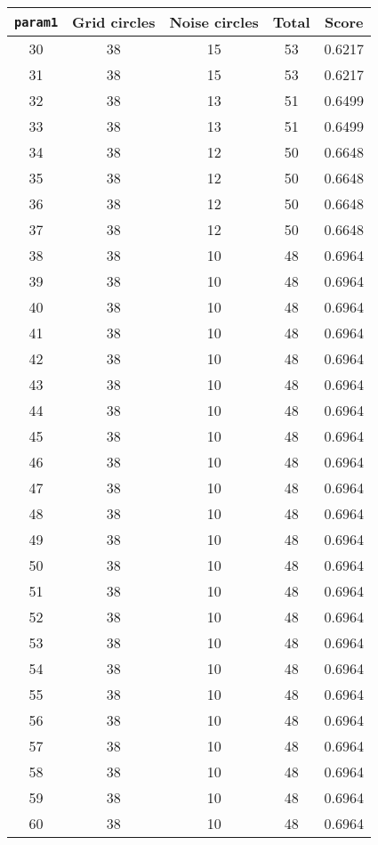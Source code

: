 \documentclass[letterpaper, 12pt]{article}
\begin{document}
\begin{longtable}{|c|c|c|c|c|}
\hline
\textbf{\texttt{param1}} & \textbf{Grid circles} & \textbf{Noise circles} & \textbf{Total} & \textbf{Score} \\
\hline
30 & 38 & 15 & 53 & 0.6217 \\
\hline
31 & 38 & 15 & 53 & 0.6217 \\
\hline
32 & 38 & 13 & 51 & 0.6499 \\
\hline
33 & 38 & 13 & 51 & 0.6499 \\
\hline
34 & 38 & 12 & 50 & 0.6648 \\
\hline
35 & 38 & 12 & 50 & 0.6648 \\
\hline
36 & 38 & 12 & 50 & 0.6648 \\
\hline
37 & 38 & 12 & 50 & 0.6648 \\
\hline
38 & 38 & 10 & 48 & 0.6964 \\
\hline
39 & 38 & 10 & 48 & 0.6964 \\
\hline
40 & 38 & 10 & 48 & 0.6964 \\
\hline
41 & 38 & 10 & 48 & 0.6964 \\
\hline
42 & 38 & 10 & 48 & 0.6964 \\
\hline
43 & 38 & 10 & 48 & 0.6964 \\
\hline
44 & 38 & 10 & 48 & 0.6964 \\
\hline
45 & 38 & 10 & 48 & 0.6964 \\
\hline
46 & 38 & 10 & 48 & 0.6964 \\
\hline
47 & 38 & 10 & 48 & 0.6964 \\
\hline
48 & 38 & 10 & 48 & 0.6964 \\
\hline
49 & 38 & 10 & 48 & 0.6964 \\
\hline
50 & 38 & 10 & 48 & 0.6964 \\
\hline
51 & 38 & 10 & 48 & 0.6964 \\
\hline
52 & 38 & 10 & 48 & 0.6964 \\
\hline
53 & 38 & 10 & 48 & 0.6964 \\
\hline
54 & 38 & 10 & 48 & 0.6964 \\
\hline
55 & 38 & 10 & 48 & 0.6964 \\
\hline
56 & 38 & 10 & 48 & 0.6964 \\
\hline
57 & 38 & 10 & 48 & 0.6964 \\
\hline
58 & 38 & 10 & 48 & 0.6964 \\
\hline
59 & 38 & 10 & 48 & 0.6964 \\
\hline
60 & 38 & 10 & 48 & 0.6964 \\

\end{longtable}
\end{document}
